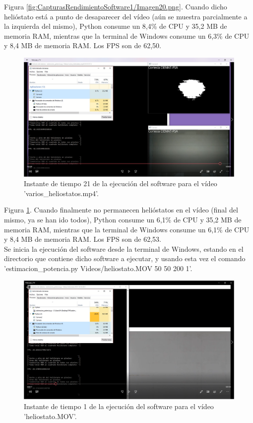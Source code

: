 Figura \ref{fig:CapturasRendimientoSoftware1/Imagen20.png}. Cuando dicho helióstato está a punto de desaparecer del vídeo (aún se muestra parcialmente a la izquierda del mismo), Python consume un 8,4\% de CPU y 35,2 MB de memoria RAM, mientras que la terminal de Windows consume un 6,3\% de CPU y 8,4 MB de memoria RAM. Los FPS son de 62,50.\\[20pt]

\begin{figure}[h!]
  	\centering
	\includegraphics[width=\textwidth]{CapturasRendimientoSoftware1/Imagen21.png}
	\caption{Instante de tiempo 21 de la ejecución del software para el vídeo 'varios\_heliostatos.mp4'.
	\label{fig:CapturasRendimientoSoftware1/Imagen21.png}}
\end{figure}

Figura \ref{fig:CapturasRendimientoSoftware1/Imagen21.png}. Cuando finalmente no permanecen helióstatos en el vídeo (final del mismo, ya se han ido todos), Python consume un 6,1\% de CPU y 35,2 MB de memoria RAM, mientras que la terminal de Windows consume un 6,1\% de CPU y 8,4 MB de memoria RAM. Los FPS son de 62,53.\\[20pt]



Se inicia la ejecución del software desde la terminal de Windows, estando en el directorio que contiene dicho software a ejecutar, y usando esta vez el comando 'estimacion\_potencia.py Videos/heliostato.MOV 50 50 200 1'.

\begin{figure}[h!]
  	\centering
	\includegraphics[width=\textwidth]{CapturasRendimientoSoftware2/Imagen1.png}
	\caption{Instante de tiempo 1 de la ejecución del software para el vídeo 'heliostato.MOV'.
	\label{fig:CapturasRendimientoSoftware2/Imagen1.png}}
\end{figure}


